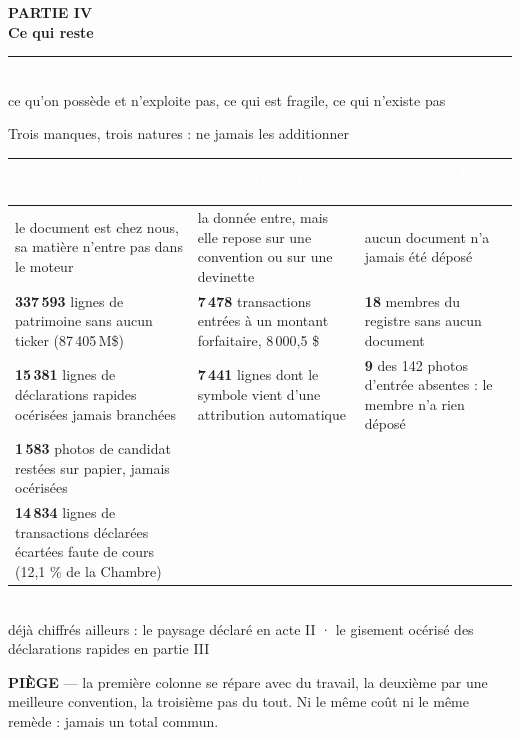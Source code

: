 \documentclass[11pt,aspectratio=169]{beamer}
\newcommand{\badge}[2]{\colorbox{#1}{\textcolor{white}{\footnotesize\textbf{#2}}}}
\newcommand{\defl}[1]{{\scriptsize\color{black!55}#1}}
\newcommand{\piege}[1]{%
  \colorbox{warnorange!12}{\parbox{\dimexpr\linewidth-8pt}{\scriptsize
    \textbf{\textcolor{warnorange}{PIÈGE}}\; --- #1}}}
\newcommand{\chapdivider}[3]{%
  \begin{frame}[plain]
    \centering\vfill
    {\color{helec!85}\large\textbf{#1}}\\[3.5mm]
    {\color{black!88}\fontsize{29}{33}\selectfont\textbf{#2}}\\[4mm]
    {\color{helec!45}\rule{0.30\textwidth}{1.2pt}}\\[4mm]
    {\color{black!55}\large #3}
    \vfill
  \end{frame}}
\begin{document}

\chapdivider{PARTIE IV}{Ce qui reste}{ce qu'on possède et n'exploite pas, ce qui est fragile, ce qui n'existe pas}

\begin{frame}{Trois manques, trois natures : ne jamais les additionner}
  \centering
  {\scriptsize\begin{tabular}{>{\raggedright\arraybackslash}p{} >{\raggedright\arraybackslash}p{} >{\raggedright\arraybackslash}p{}}
    \toprule
    \badge{dataC}{ON LE POSSÈDE} & \badge{warnorange}{C'EST FRAGILE} & \badge{alertred}{ÇA N'EXISTE PAS}\\
    \midrule
    le document est chez nous, sa matière n'entre pas dans le moteur
      & la donnée entre, mais elle repose sur une convention ou sur une devinette
      & aucun document n'a jamais été déposé\\[1.5mm]
    \textbf{337\,593} lignes de patrimoine sans aucun ticker (87\,405\,M\$)
      & \textbf{7\,478} transactions entrées à un montant forfaitaire, 8\,000,5 \$
      & \textbf{18} membres du registre sans aucun document\\[1.2mm]
    \textbf{15\,381} lignes de déclarations rapides océrisées jamais branchées
      & \textbf{7\,441} lignes dont le symbole vient d'une attribution automatique
      & \textbf{9} des 142 photos d'entrée absentes : le membre n'a rien déposé\\[1.2mm]
    \textbf{1\,583} photos de candidat restées sur papier, jamais océrisées
      & &\\[1.2mm]
    \textbf{14\,834} lignes de transactions déclarées écartées faute de cours \defl{(12,1 \% de la Chambre)}
      & &\\
    \bottomrule
  \end{tabular}}\\[2mm]
  \defl{déjà chiffrés ailleurs : le paysage déclaré en acte II · le gisement océrisé des
  déclarations rapides en partie III}\\[1.5mm]
  \piege{la première colonne se répare avec du travail, la deuxième par une meilleure convention,
  la troisième pas du tout. Ni le même coût ni le même remède : jamais un total commun.}
\end{frame}
\end{document}

